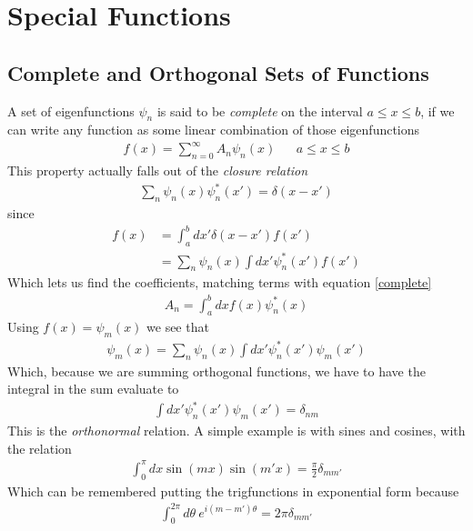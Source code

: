 \section{Special Functions}
\subsection{Complete and Orthogonal Sets of Functions}
A set of eigenfunctions $\psi_n$ is said to be \emph{complete} on the interval $a\le x\le b$, if we can write any function as some linear combination of those eigenfunctions 
\begin{align}\label{complete}
f(x) = \sum_{n=0}^\infty A_n \psi_n(x) && a\le x\le b
\end{align}
This property actually falls out of the \emph{closure relation}
\begin{align}
\sum_n \psi_n(x)\psi_n^*(x') = \delta(x-x')
\end{align}
since 
\begin{align}
f(x) &= \int_a^b dx' \delta(x-x')f(x')\\
&= \sum_n \psi_n(x) \int dx' \psi_n^*(x') f(x')
\end{align}
Which lets us find the coefficients, matching terms with equation \ref{complete}
\begin{align}
A_n = \int_{a}^b dx f(x)\psi^*_n(x)
\end{align}
Using $f(x) = \psi_m(x)$ we see that
\begin{align}
\psi_m(x) = \sum_n \psi_n(x) \int dx' \psi_n^*(x') \psi_m(x')
\end{align}
Which, because we are summing orthogonal functions, we have to have the integral in the sum evaluate to
\begin{align}
 \int dx' \psi_n^*(x') \psi_m(x') = \delta_{nm}
\end{align}
This is the \emph{orthonormal} relation. A simple example is with sines and cosines, with the relation
\begin{align}
\int_0^\pi dx\sin (mx)\sin (m'x) = \frac{\pi}{2}\delta_{mm'}
\end{align}
Which can be remembered putting the trigfunctions in exponential form because
\begin{align}
\int_0^{2\pi} d\theta~ e^{i(m-m')\theta} = 2\pi\delta_{mm'}
\end{align}




